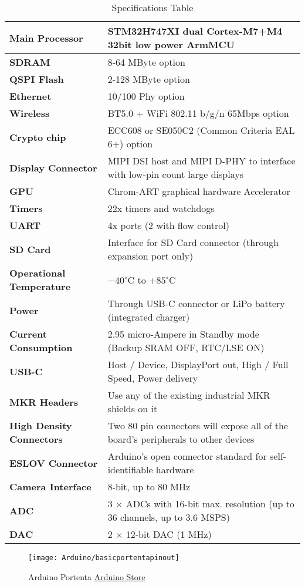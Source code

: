 \begin{table}[h]
	\centering
	\caption{Specifications Table}
	\label{table1}
	\begin{tabular}{|p{5cm}| p{10cm} |} 
		\hline
		\textbf{Main Processor} & STM32H747XI dual Cortex\textregistered-M7+M4 32bit low power Arm\textregistered MCU \\ \hline 
		\textbf{SDRAM} & 8-64 MByte option \\ \hline
		\textbf{QSPI Flash}	& 2-128 MByte option \\ \hline
		\textbf{Ethernet}	& 10/100 Phy option\\ \hline
		\textbf{Wireless} & BT5.0 + WiFi 802.11 b/g/n 65Mbps option\\ \hline
		\textbf{Crypto chip}	& ECC608 or SE050C2 (Common Criteria EAL 6+) option\\ \hline
		\textbf{Display Connector}	& MIPI DSI host and  MIPI D-PHY to interface with low-pin count large displays \\
		\hline
		\textbf{GPU} & Chrom-ART graphical hardware Accelerator \\ \hline
		\textbf{Timers}	& 22x timers and watchdogs \\ \hline
		\textbf{UART}	& 4x ports (2 with flow control)\\ \hline
		\textbf{SD Card}	& 	Interface for SD Card connector (through expansion port only)\\ \hline
		\textbf{Operational Temperature}	& $-40^\circ$C to $+85^\circ$C \\ \hline
		\textbf{Power} & Through USB-C connector or LiPo battery (integrated charger) \\ \hline
		\textbf{Current Consumption} & 2.95 micro-Ampere in Standby mode (Backup SRAM OFF, RTC/LSE ON) \\ 
		\hline
		\textbf{USB-C} & Host / Device, DisplayPort out, High / Full Speed, Power delivery \\ \hline
		\textbf{MKR Headers} & Use any of the existing industrial MKR shields on it \\ \hline
		\textbf{High Density Connectors}	& Two 80 pin connectors will expose all of the board's peripherals to other devices \\ \hline
		\textbf{ESLOV Connector}	& Arduino's open connector standard for self-identifiable hardware \\ \hline
		\textbf{Camera Interface} &	8-bit, up to 80 MHz \\ \hline
		\textbf{ADC} & 3 $\times$ ADCs with 16-bit max. resolution (up to 36 channels, up to 3.6 MSPS) \\ \hline
		\textbf{DAC} & 2 $\times$ 12-bit DAC (1 MHz) \\ \hline
	\end{tabular}
\end{table} 
\vspace{-1.2cm}
\begin{figure}[H]
	\centering
	\texttt{[image: Arduino/basicportentapinout]}
	\caption{Arduino Portenta  \href{https://store.arduino.cc/portenta-h7}{Arduino Store}}\label{figure 3.1}
\end{figure}

